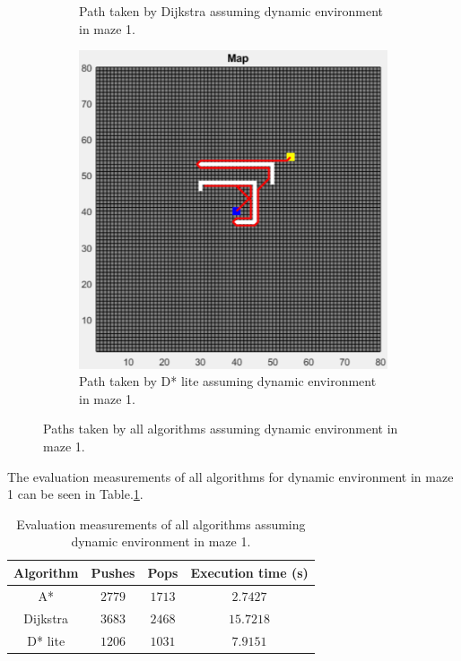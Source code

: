 \begin{figure}
\begin{subfigure}[t]{0.32\columnwidth}
		\caption{Path taken by Dijkstra assuming dynamic environment in maze 1.}
        \label{fig:dijkstra_dynamic_path_maze_1}
	\end{subfigure}
    \hfill
    \begin{subfigure}[t]{0.32\columnwidth}
		\centering
		\includegraphics[width=\textwidth]{images/d_star_lite_dynamic_maze_1.png}
		\caption{Path taken by D* lite assuming dynamic environment in maze 1.}
        \label{fig:d_star_dynamic_path_maze_1}
	\end{subfigure}
	\caption{Paths taken by all algorithms assuming dynamic environment in maze 1.}
    \label{fig:dynamic_path_maze_1}
\end{figure}

The evaluation measurements of all algorithms for dynamic environment in maze 1 can be seen in Table.\:\ref{tab:metric_dynamic_maze_1}.

\begin{table}
    \centering
    \begin{tabular}{c|c|c|c}
        Algorithm   & Pushes    & Pops      & Execution time (s)    \\ \hline
        A*          & $2779$    & $1713$    & $2.7427$              \\
        Dijkstra    & $3683$    & $2468$    & $15.7218$             \\
        D* lite     & $1206$    & $1031$    & $7.9151$
    \end{tabular}
    \caption{Evaluation measurements of all algorithms assuming dynamic environment in maze 1.}
    \label{tab:metric_dynamic_maze_1}
\end{table}

